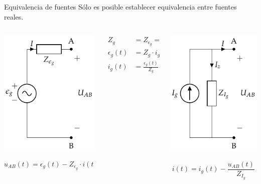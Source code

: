 \documentclass[xcolor={usenames,svgnames,dvipsnames}]{beamer}
\begin{document}
\begin{frame}[label={sec:orgc5d7d28}]{Equivalencia de fuentes}
Sólo es posible establecer equivalencia entre \alert{fuentes reales}.
\begin{columns}
\begin{column}{0.33\columnwidth}
\begin{center}
\includegraphics[height=0.5\textheight]{figs/FuenteTensionReal.pdf}
\end{center}
\[
  u_{AB}(t) = \epsilon_g(t) - Z_{\epsilon_g} \cdot i(t)
\]
\end{column}
\begin{column}{0.33\columnwidth}
\begin{align*}
  Z_g &= Z_{\epsilon_g} = Z_{I_g}\\
  \epsilon_g(t) &= Z_g \cdot i_g(t)\\
  i_g(t) &= \frac{\epsilon_g(t)}{Z_g}
\end{align*}
\end{column}
\begin{column}{0.33\columnwidth}
\begin{center}
\includegraphics[height=0.5\textheight]{figs/FuenteCorrienteReal.pdf}
\end{center}
\[
  i(t) = i_g(t) - \frac{u_{AB}(t)}{Z_{I_g}}
\]
\end{column}
\end{columns}
\end{frame}
\end{document}
